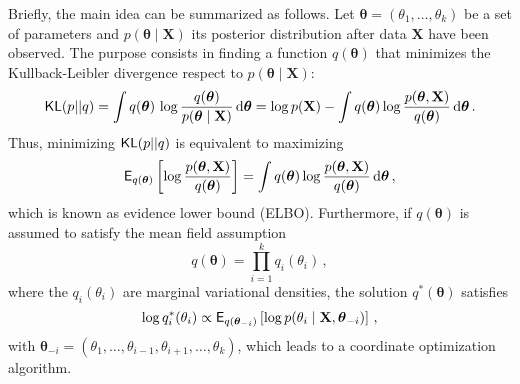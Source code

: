\documentclass[letterpaper,10pt,openany]{article}
\def\frac#1#2{{{#1}\over{#2}}}
\def\X{\mathbf{X}}\def\x{\mathbf{x}}\def\Xv{\boldsymbol{X}}\def\xv{\boldsymbol{x}}
\def\te{\theta}\def\tev{\boldsymbol{\theta}}
\def\tev{\boldsymbol{\theta}}
\begin{document}
Briefly, the main idea can be summarized as follows. Let $\tev=(\te_1,\ldots,\te_k)$ be a set of parameters and $p(\tev \mid \X)$ its posterior distribution after data $\X$ have been observed. The purpose consists in finding a function $q(\tev)$ that minimizes the  Kullback-Leibler divergence respect to $p(\tev \mid \X)$:
\begin{equation*}
\text{\textsf{KL}}(p||q)=\int q(\tev)\,\log\frac{q(\tev)}{p(\tev\mid\X)}\,\text{d}\tev = \log p(\X) - \int q(\tev)\log\frac{p(\tev,\X)}{q(\tev)}\,\text{d}\tev\,.
\end{equation*}
Thus, minimizing $\text{\textsf{KL}}(p||q)$ is equivalent to maximizing
$$
\text{\textsf{E}}_{q(\tev)}\left[\log\frac{p(\tev,\X)}{q(\tev)}\right] = \int q(\tev)\log\frac{p(\tev,\X)}{q(\tev)}\,\text{d}\tev\,,
$$
which is known as evidence lower bound (\textsf{ELBO}). Furthermore, if $q(\tev)$ is assumed to satisfy the mean field assumption
$$
q(\tev) = \prod_{i=1}^k q_i(\theta_i)\,,
$$
where the $q_i(\theta_i)$ are marginal variational densities, the solution $q^*(\tev)$ satisfies
$$
\log q_i^*(\te_i) \propto \text{\textsf{E}}_{q(\tev_{-i})} \left[ \log p(\te_i\mid\X,\tev_{-i}) \right]\,,
$$
with $\tev_{-i} = (\theta_1,\ldots,\theta_{i-1},\theta_{i+1},\ldots,\theta_k)$, which leads to a coordinate optimization algorithm.
\end{document}
